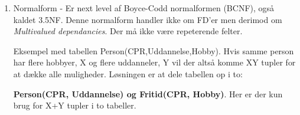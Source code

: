 \begin{enumerate}
	\item Normalform - Er next level af Boyce-Codd normalformen (BCNF), også kaldet 3.5NF.
	Denne normalform handler ikke om FD'er men derimod om \textit{Multivalued dependancies}.
	Der må ikke være repeterende felter.
	
	Eksempel med tabellen Person(CPR,Uddannelse,Hobby). Hvis samme person har flere hobbyer, X og flere uddanneler, Y vil der altså komme XY tupler for at dække alle muligheder. Løsningen er at dele tabellen op i to: 
	
	\textbf{Person(CPR, Uddannelse) og Fritid(CPR, Hobby)}. Her er der kun brug for X+Y tupler i to tabeller.

\end{enumerate}
